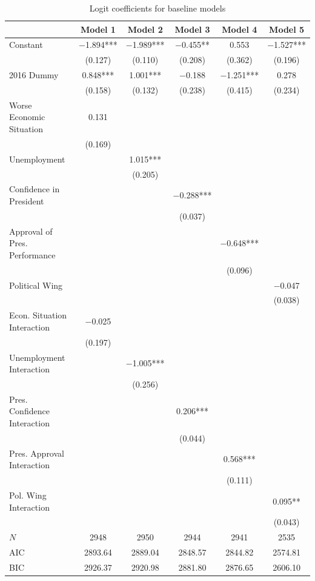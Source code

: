 \documentclass[12pt,a4]{article}
\begin{document}
\begin{table}[htbp]
\caption{Logit coefficients for baseline models}
\label{tab:simplemodel}

\begin{tabular}[t]{lccccc}
\toprule
  & Model 1 & Model 2 & Model 3 & Model 4 & Model 5\\
\midrule
Constant & \num{-1.894}*** & \num{-1.989}*** & \num{-0.455}** & \num{0.553} & \num{-1.527}***\\
 & (\num{0.127}) & (\num{0.110}) & (\num{0.208}) & (\num{0.362}) & (\num{0.196})\\
2016 Dummy & \num{0.848}*** & \num{1.001}*** & \num{-0.188} & \num{-1.251}*** & \num{0.278}\\
 & (\num{0.158}) & (\num{0.132}) & (\num{0.238}) & (\num{0.415}) & (\num{0.234})\\
Worse Economic Situation & \num{0.131} &  &  &  & \\
 & (\num{0.169}) &  &  &  & \\
Unemployment &  & \num{1.015}*** &  &  & \\
 &  & (\num{0.205}) &  &  & \\
Confidence in President &  &  & \num{-0.288}*** &  & \\
 &  &  & (\num{0.037}) &  & \\
Approval of Pres. Performance &  &  &  & \num{-0.648}*** & \\
 &  &  &  & (\num{0.096}) & \\
Political Wing &  &  &  &  & \num{-0.047}\\
 &  &  &  &  & (\num{0.038})\\
Econ. Situation Interaction & \num{-0.025} &  &  &  & \\
 & (\num{0.197}) &  &  &  & \\
Unemployment Interaction &  & \num{-1.005}*** &  &  & \\
 &  & (\num{0.256}) &  &  & \\
Pres. Confidence Interaction &  &  & \num{0.206}*** &  & \\
 &  &  & (\num{0.044}) &  & \\
Pres. Approval Interaction &  &  &  & \num{0.568}*** & \\
 &  &  &  & (\num{0.111}) & \\
Pol. Wing Interaction &  &  &  &  & \num{0.095}**\\
 &  &  &  &  & (\num{0.043})\\
\midrule
$N$ & \num{2948} & \num{2950} & \num{2944} & \num{2941} & \num{2535}\\
AIC & \num{2893.64} & \num{2889.04} & \num{2848.57} & \num{2844.82} & \num{2574.81}\\
BIC & \num{2926.37} & \num{2920.98} & \num{2881.80} & \num{2876.65} & \num{2606.10}\\
\bottomrule
\end{tabular}



\end{table}
\end{document}
